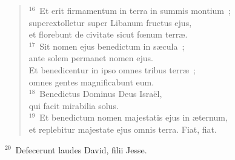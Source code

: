 \begin{verse}
${}^{16}$~Et erit firmamentum in terra in summis montium~;\\ superextolletur super Libanum fructus ejus,\\ et florebunt de civitate sicut fœnum terr\ae .\\
${}^{17}$~Sit nomen ejus benedictum in s\ae cula~;\\ ante solem permanet nomen ejus.\\ Et benedicentur in ipso omnes tribus terr\ae~;\\ omnes gentes magnificabunt eum.\\
${}^{18}$~Benedictus Dominus Deus Isra\"el,\\ qui facit mirabilia solus.\\
${}^{19}$~Et benedictum nomen majestatis ejus in \ae ternum,\\ et replebitur majestate ejus omnis terra. Fiat, fiat.\end{verse}


${}^{20}$~Defecerunt laudes David, filii Jesse.

